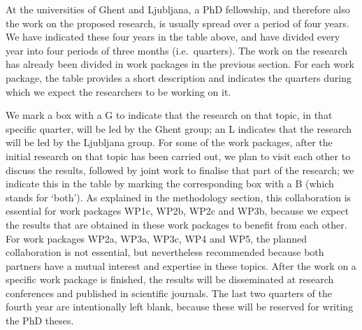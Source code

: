 \documentclass[11pt,dvipsnames,usenames,a4paper]{article}
\begin{document}
At the universities of Ghent and Ljubljana, a PhD fellowship, and therefore also the work on the proposed research, is usually spread over a period of four years.
We have indicated these four years in the table above, and have divided every year into four periods of three months (i.e.~quarters).
The work on the research has already been divided in work packages in the previous section.
For each work package, the table provides a short description and indicates the quarters during which we expect the researchers to be working on it.

We mark a box with a G to indicate that the research on that topic, in that specific quarter, will be led by the Ghent group; an L indicates that the research will be led by the Ljubljana group. 
For some of the work packages, after the initial research on that topic has been carried out, we plan to visit each other to discuss the results, followed by joint work to finalise that part of the research; we indicate this in the table by marking the corresponding box with a B (which stands for `both'). As explained in the methodology section, this collaboration is essential for work packages WP1c, WP2b, WP2c and WP3b, because we expect the results that are obtained in these work packages to benefit from each other. For work packages WP2a, WP3a, WP3c, WP4 and WP5, the planned collaboration is not essential, but nevertheless recommended because both partners have a mutual interest and expertise in these topics.
After the work on a specific work package is finished, the results will be disseminated at research conferences and published in scientific journals. 
The last two quarters of the fourth year are intentionally left blank, because these will be reserved for writing the PhD theses. 



\end{document}
